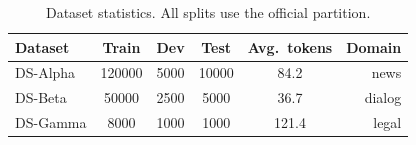 \begin{table}[t]
  \centering
  \caption{Dataset statistics. All splits use the official partition.}
  \label{tab:datasets}
  \begin{tabular}{l S[table-format=6.0,group-separator={,}] S[table-format=5.0,group-separator={,}]
                    S[table-format=5.0,group-separator={,}] S[table-format=2.1] r}
    \toprule
    Dataset & {Train} & {Dev} & {Test} & {Avg.\ tokens} & Domain \\
    \midrule
    DS-Alpha   & 120000 & 5000  & 10000 & 84.2 & news \\
    DS-Beta    & 50000  & 2500  & 5000  & 36.7 & dialog \\
    DS-Gamma   & 8000   & 1000  & 1000  & 121.4 & legal \\
    \bottomrule
  \end{tabular}
\end{table}
